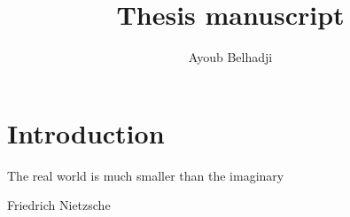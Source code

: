 \documentclass[twoside,11pt]{book}
\numberwithin{theorem}{chapter}
\numberwithin{definition}{chapter}
\numberwithin{proposition}{chapter}
\numberwithin{corollary}{chapter}
\numberwithin{example}{chapter}
\numberwithin{lemma}{chapter}
\numberwithin{assumption}{chapter}
\numberwithin{equation}{chapter}
\numberwithin{figure}{chapter}
\begin{document}
\title{Thesis manuscript}


\maketitleGM
\author{Ayoub Belhadji} %
 






\newpage
\tableofcontents



\chapter{Introduction}\label{chap:introduction}

\epigraph{The real world is much smaller than the imaginary}{Friedrich Nietzsche}

\end{document}
